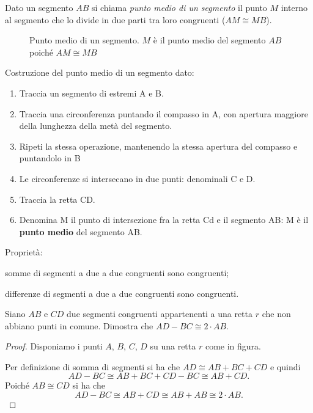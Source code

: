 \begin{definizione}
Dato un segmento $AB$ si chiama \emph{punto medio di un segmento} il 
punto $M$ interno al segmento che lo divide in due parti tra loro 
congruenti ($AM\cong MB$).
\end{definizione}


\begin{inaccessibleblock}
 \begin{figure}[htb]
\centering
\caption{Punto medio di un segmento. $M$ è il punto medio del 
segmento $AB$ poiché $AM\cong MB$}
\end{figure}
\end{inaccessibleblock}

\begin{procedura}
	Costruzione del punto medio di un segmento dato:
	\begin{enumerate} [nosep]
		\item 
		Traccia un segmento di estremi A e B.	
		\item 
		Traccia una circonferenza puntando il compasso in A, con apertura maggiore della lunghezza della metà del segmento.	
		\item 
		Ripeti la stessa operazione, mantenendo la stessa apertura del compasso e 		puntandolo in B 
		\item 
		Le circonferenze si intersecano in due punti: denominali C e D. 
		\item 
		Traccia la retta CD.
		\item 
		Denomina M il punto di intersezione fra la retta Cd e il segmento AB: M è il \textbf{punto medio} del segmento AB.
		\end{enumerate}
\end{procedura}

Proprietà:
\begin{itemize*}
\item somme di segmenti a due a due congruenti sono congruenti; 
\item differenze di segmenti a due a due congruenti sono congruenti.
\end{itemize*}

\begin{exrig}
\begin{esempio}
Siano $AB$ e $CD$ due segmenti congruenti appartenenti a una retta 
$r$ che non abbiano punti in comune. Dimostra che $AD-BC\cong 2\cdot 
AB$.
\begin{proof}
Disponiamo i punti $A$, $B$, $C$, $D$ su una retta $r$ come in figura.

\begin{inaccessibleblock}
 \begin{figure}[htb]
\centering
\end{figure}
\end{inaccessibleblock}

Per definizione di somma di segmenti si ha che $AD\cong AB+BC+CD$ e 
quindi
\[AD-BC\cong AB+BC+CD-BC\cong AB+CD.\]
Poiché $AB\cong CD$ si ha che
\[AD-BC\cong AB+CD\cong AB+AB\cong 2\cdot AB.\]
\end{proof}
\end{esempio}
\end{exrig}

